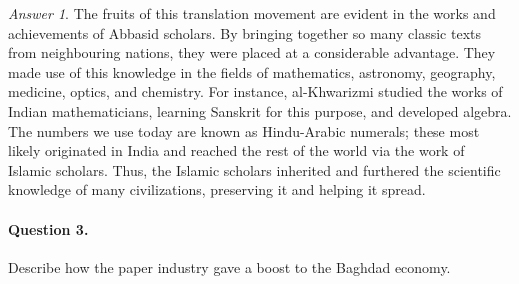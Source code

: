 \documentclass[11pt]{article}
\theoremstyle{remark}
\newtheorem*{answer}{Answer}
\begin{document}
\begin{answer}
        The fruits of this translation movement are evident in the works and
        achievements of Abbasid scholars. By bringing together so many classic texts
        from neighbouring nations, they were placed at a considerable advantage. They
        made use of this knowledge in the fields of mathematics, astronomy,
        geography, medicine, optics, and chemistry. For instance, al-Khwarizmi
        studied the works of Indian mathematicians, learning Sanskrit for this
        purpose, and developed algebra. The numbers we use today are known as
        Hindu-Arabic numerals; these most likely originated in India and reached the
        rest of the world via the work of Islamic scholars. Thus, the Islamic
        scholars inherited and furthered the scientific knowledge of many
        civilizations, preserving it and helping it spread.
    \end{answer}

    \paragraph{Question 3.} Describe how the paper industry gave a boost to the
    Baghdad economy.
\end{document}
